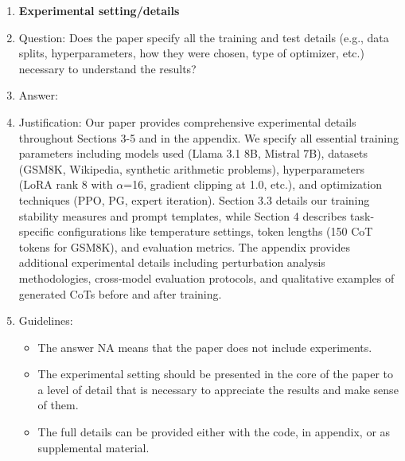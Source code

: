 \documentclass{article}
\begin{document}
\begin{enumerate}
\item {\bf Experimental setting/details}
    \item[] Question: Does the paper specify all the training and test details (e.g., data splits, hyperparameters, how they were chosen, type of optimizer, etc.) necessary to understand the results?
    \item[] Answer: \answerYes{} %
    \item[] Justification: Our paper provides comprehensive experimental details throughout Sections 3-5 and in the appendix. We specify all essential training parameters including models used (Llama 3.1 8B, Mistral 7B), datasets (GSM8K, Wikipedia, synthetic arithmetic problems), hyperparameters (LoRA rank 8 with $\alpha$=16, gradient clipping at 1.0, etc.), and optimization techniques (PPO, PG, expert iteration). Section 3.3 details our training stability measures and prompt templates, while Section 4 describes task-specific configurations like temperature settings, token lengths (150 CoT tokens for GSM8K), and evaluation metrics. The appendix provides additional experimental details including perturbation analysis methodologies, cross-model evaluation protocols, and qualitative examples of generated CoTs before and after training.
    \item[] Guidelines:
    \begin{itemize}
        \item The answer NA means that the paper does not include experiments.
        \item The experimental setting should be presented in the core of the paper to a level of detail that is necessary to appreciate the results and make sense of them.
        \item The full details can be provided either with the code, in appendix, or as supplemental material.
    \end{itemize}


\end{enumerate}
\end{document}

